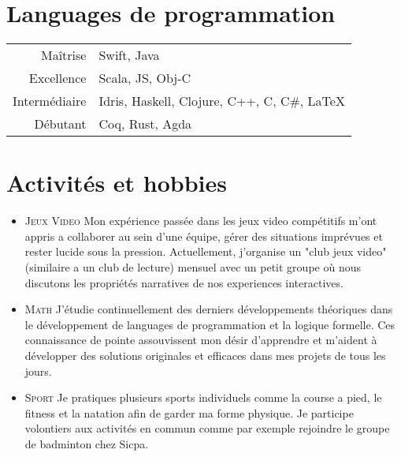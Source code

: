 \documentclass[a4paper,10pt]{article} %
\begin{document}

\section{Languages de programmation}

\begin{tabular}{r|l}
Maîtrise & Swift, Java\\
Excellence & Scala, JS, Obj-C\\
Intermédiaire & Idris, Haskell, Clojure, C++, C, C\#, \LaTeX\\
Débutant & Coq, Rust, Agda\\
\end{tabular}

\section{Activités et hobbies}
\begin{itemize}
	\item \textsc{Jeux Video} Mon expérience passée dans les jeux video compétitifs m'ont appris a collaborer au sein d'une équipe, gérer des situations imprévues et rester lucide sous la pression. Actuellement, j'organise un "club jeux video" (similaire a un club de lecture) mensuel avec un petit groupe où nous discutons les propriétés narratives de nos experiences interactives.
	\item \textsc{Math} J'étudie continuellement des derniers développements théoriques dans le développement de languages de programmation et la logique formelle. Ces connaissance de pointe assouvissent mon désir d'apprendre et m'aident à développer des solutions originales et efficaces dans mes projets de tous les jours.
	\item \textsc{Sport} Je pratiques plusieurs sports individuels comme la course a pied, le fitness et la natation afin de garder ma forme physique. Je participe volontiers aux activités en commun comme par exemple rejoindre le groupe de badminton chez Sicpa.
\end{itemize}
\end{document}
